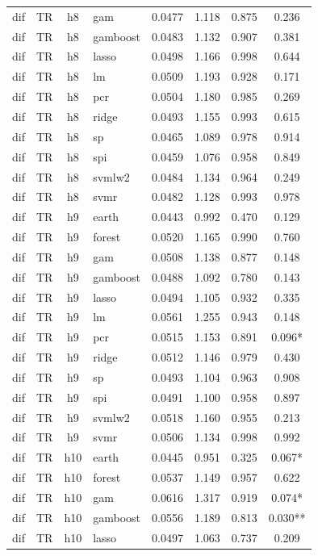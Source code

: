 \begin{ThreePartTable}
\begin{longtable}[t]{llclcccc}
dif & TR & h8 & gam & 0.0477 & 1.118 & 0.875 & 0.236\\
dif & TR & h8 & gamboost & 0.0483 & 1.132 & 0.907 & 0.381\\
dif & TR & h8 & lasso & 0.0498 & 1.166 & 0.998 & 0.644\\
dif & TR & h8 & lm & 0.0509 & 1.193 & 0.928 & 0.171\\
dif & TR & h8 & pcr & 0.0504 & 1.180 & 0.985 & 0.269\\
dif & TR & h8 & ridge & 0.0493 & 1.155 & 0.993 & 0.615\\
dif & TR & h8 & sp & 0.0465 & 1.089 & 0.978 & 0.914\\
dif & TR & h8 & spi & 0.0459 & 1.076 & 0.958 & 0.849\\
dif & TR & h8 & svmlw2 & 0.0484 & 1.134 & 0.964 & 0.249\\
dif & TR & h8 & svmr & 0.0482 & 1.128 & 0.993 & 0.978\\
\addlinespace
dif & TR & h9 & earth & 0.0443 & 0.992 & 0.470 & 0.129\\
dif & TR & h9 & forest & 0.0520 & 1.165 & 0.990 & 0.760\\
dif & TR & h9 & gam & 0.0508 & 1.138 & 0.877 & 0.148\\
dif & TR & h9 & gamboost & 0.0488 & 1.092 & 0.780 & 0.143\\
dif & TR & h9 & lasso & 0.0494 & 1.105 & 0.932 & 0.335\\
dif & TR & h9 & lm & 0.0561 & 1.255 & 0.943 & 0.148\\
dif & TR & h9 & pcr & 0.0515 & 1.153 & 0.891 & 0.096*\\
dif & TR & h9 & ridge & 0.0512 & 1.146 & 0.979 & 0.430\\
dif & TR & h9 & sp & 0.0493 & 1.104 & 0.963 & 0.908\\
dif & TR & h9 & spi & 0.0491 & 1.100 & 0.958 & 0.897\\
dif & TR & h9 & svmlw2 & 0.0518 & 1.160 & 0.955 & 0.213\\
dif & TR & h9 & svmr & 0.0506 & 1.134 & 0.998 & 0.992\\
\addlinespace
dif & TR & h10 & earth & 0.0445 & 0.951 & 0.325 & 0.067*\\
dif & TR & h10 & forest & 0.0537 & 1.149 & 0.957 & 0.622\\
dif & TR & h10 & gam & 0.0616 & 1.317 & 0.919 & 0.074*\\
dif & TR & h10 & gamboost & 0.0556 & 1.189 & 0.813 & 0.030**\\
dif & TR & h10 & lasso & 0.0497 & 1.063 & 0.737 & 0.209\\

\end{longtable}
\end{ThreePartTable}
